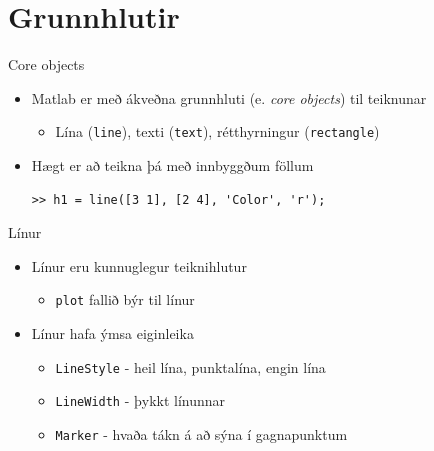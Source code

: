 \documentclass[handout]{beamer}
\begin{document}
\section{Grunnhlutir}

\begin{frame}[fragile]{Core objects}
\begin{itemize}
 \item Matlab er með ákveðna grunnhluti (e. \emph{core objects}) til teiknunar
 \begin{itemize}
  \item Lína (\texttt{line}), texti (\texttt{text}), rétthyrningur (\texttt{rectangle})
 \end{itemize}
 \item Hægt er að teikna þá með innbyggðum föllum
\begin{verbatim}
>> h1 = line([3 1], [2 4], 'Color', 'r');
\end{verbatim}
\end{itemize}
\end{frame}

\begin{frame}{Línur}
\begin{itemize}
 \item Línur eru kunnuglegur teiknihlutur
 \begin{itemize}
  \item \texttt{plot} fallið býr til línur
 \end{itemize}
 \item Línur hafa ýmsa eiginleika
 \begin{itemize}
  \item \texttt{LineStyle} - heil lína, punktalína, engin lína
  \item \texttt{LineWidth} - þykkt línunnar
  \item \texttt{Marker} - hvaða tákn á að sýna í gagnapunktum
 \end{itemize}
\end{itemize}
\end{frame}
\end{document}

